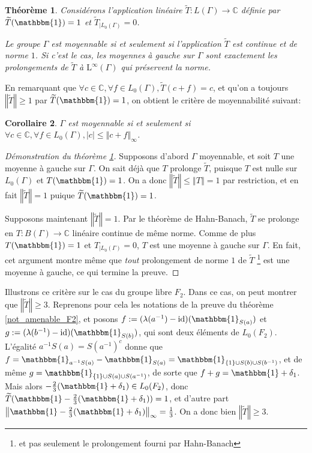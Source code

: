 \documentclass[a4paper,12pt]{article}
\newtheorem{theorem}{Théorème}[section]
\newtheorem{corollary}[theorem]{Corollaire}
\newcommand{\C}{\mathbb{C}}
\newcommand{\norm}[1]{\left\Vert #1\right\Vert}
\newcommand{\abs}[1]{\left\vert#1\right\vert}
\newcommand{\set}[1]{\left\{ #1 \right\}}
\newcommand{\indic}{\mathbbm{1}}
\newcommand{\ssi}{si et seulement si }
\newcommand{\inv}{^{-1}}
\newcommand{\compl}{^c}
\DeclareMathOperator{\id}{id}
\begin{document}
\begin{theorem}\label{left_mean_iff}
    Considérons l'application linéaire $\widetilde{T} : L(\Gamma)\to\C$ définie par $\widetilde{T}(\indic) = 1$
    et $\widetilde{T}_{|L_0(\Gamma)} = 0$. 
    
    Le groupe $\Gamma$ est moyennable \ssi l'application $\widetilde{T}$ est continue et de norme $1$.
    Si c'est le cas, les moyennes à gauche sur $\Gamma$ sont exactement les prolongements de $\widetilde{T}$ à 
    $\mathrm{L}^\infty(\Gamma)$ qui préservent la norme.
\end{theorem}

En remarquant que $\forall c\in\C, \forall f\in L_0(\Gamma), \widetilde{T}(c + f) = c$, et qu'on a toujours 
$\norm{\widetilde{T}}\ge1$ par $\widetilde{T}(\indic) = 1$, on obtient le critère de moyennabilité suivant:

\begin{corollary}\label{amenable_iff_L0}
    $\Gamma$ est moyennable \ssi $\forall c\in\C, \forall f\in L_0(\Gamma), \abs{c}\le\norm{c + f}_\infty$.
\end{corollary}

\begin{proof}[Démonstration du théorème \ref{left_mean_iff}]
    Supposons d'abord $\Gamma$ moyennable, et soit $T$ une moyenne à gauche sur $\Gamma$.
    On sait déjà que $T$ prolonge $\widetilde{T}$, puisque $T$ est nulle sur $L_0(\Gamma)$ et 
    $T(\indic)=1$. On a donc $\norm{\widetilde{T}}\le\norm{T}=1$ par restriction, et en fait $\norm{\widetilde{T}} = 1$
    puique $\widetilde{T}(\indic)=1$. 

    Supposons maintenant $\norm{\widetilde{T}}=1$. Par le théorème de Hahn-Banach, $\widetilde{T}$ se prolonge 
    en $T:B(\Gamma)\to\C$ linéaire continue de même norme. Comme de plus $T(\indic)=1$ et 
    $T_{|L_0(\Gamma)} = 0$, $T$ est une moyenne à gauche sur $\Gamma$. En fait, cet argument montre même 
    que \emph{tout} prolongement de norme $1$ de $\widetilde{T}$ \footnote{et pas seulement le prolongement fourni par Hahn-Banach} 
    est une moyenne à gauche, ce qui termine la preuve.
\end{proof}

Illustrons ce critère sur le cas du groupe libre $F_2$. Dans ce cas, on peut montrer que $\norm{\widetilde{T}}\ge3$.
Reprenons pour cela les notations de la preuve du théorème \ref{not_amenable_F2}, et posons $f := (\lambda(a\inv)-\id)(\indic_{S(a)})$ et 
$g:=(\lambda(b\inv) - \id)(\indic_{S(b)})$, qui sont deux éléments de $L_0(F_2)$. L'égalité $a\inv S(a) = S(a\inv)\compl$ donne que 
$f = \indic_{a\inv S(a)} - \indic_{S(a)} = \indic_{\set{1}\cup S(b)\cup S(b\inv)}$, et de même 
$g = \indic_{\set{1}\cup S(a)\cup S(a\inv)}$, de sorte que $f+g=\indic + \delta_1$. Mais alors 
$-\frac23(\indic+\delta_1)\in L_0(F_2)$, donc $\widetilde{T}(\indic - \frac23(\indic+\delta_1)) = 1$, 
et d'autre part $\norm{\indic - \frac23(\indic+\delta_1)}_\infty=\frac13$. 
On a donc bien $\norm{\widetilde{T}}\geq3$.
\end{document}
